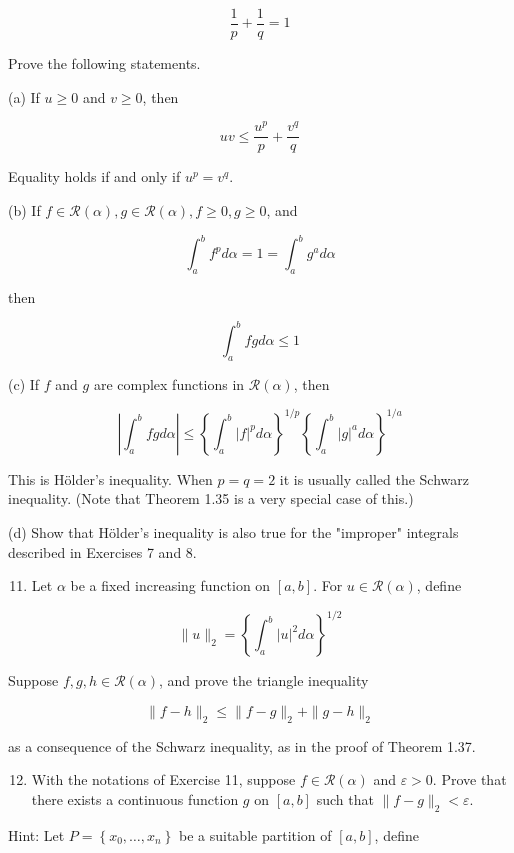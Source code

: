 \documentclass[10pt]{article}
\begin{document}
$$
\frac{1}{p}+\frac{1}{q}=1
$$

Prove the following statements.

(a) If $u \geq 0$ and $v \geq 0$, then

$$
u v \leq \frac{u^{p}}{p}+\frac{v^{q}}{q}
$$

Equality holds if and only if $u^{p}=v^{q}$.

(b) If $f \in \mathscr{R}(\alpha), g \in \mathscr{R}(\alpha), f \geq 0, g \geq 0$, and

$$
\int_{a}^{b} f^{p} d \alpha=1=\int_{a}^{b} g^{a} d \alpha
$$

then

$$
\int_{a}^{b} f g d \alpha \leq 1
$$

(c) If $f$ and $g$ are complex functions in $\mathscr{R}(\alpha)$, then

$$
\left|\int_{a}^{b} f g d \alpha\right| \leq\left\{\int_{a}^{b}|f|^{p} d \alpha\right\}^{1 / p}\left\{\int_{a}^{b}|g|^{a} d \alpha\right\}^{1 / a}
$$

This is Hölder's inequality. When $p=q=2$ it is usually called the Schwarz inequality. (Note that Theorem 1.35 is a very special case of this.)

(d) Show that Hölder's inequality is also true for the "improper" integrals described in Exercises 7 and 8.

\begin{enumerate}
  \setcounter{enumi}{10}
  \item Let $\alpha$ be a fixed increasing function on $[a, b]$. For $u \in \mathscr{R}(\alpha)$, define
\end{enumerate}

$$
\|u\|_{2}=\left\{\int_{a}^{b}|u|^{2} d \alpha\right\}^{1 / 2}
$$

Suppose $f, g, h \in \mathscr{R}(\alpha)$, and prove the triangle inequality

$$
\|f-h\|_{2} \leq\|f-g\|_{2}+\|g-h\|_{2}
$$

as a consequence of the Schwarz inequality, as in the proof of Theorem 1.37.

\begin{enumerate}
  \setcounter{enumi}{11}
  \item With the notations of Exercise 11, suppose $f \in \mathscr{R}(\alpha)$ and $\varepsilon>0$. Prove that there exists a continuous function $g$ on $[a, b]$ such that $\|f-g\|_{2}<\varepsilon$.
\end{enumerate}

Hint: Let $P=\left\{x_{0}, \ldots, x_{n}\right\}$ be a suitable partition of $[a, b]$, define
\end{document}
